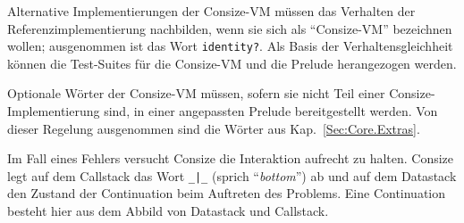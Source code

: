 Alternative Implementierungen der Consize-VM müssen das Verhalten der Referenzimplementierung nachbilden, wenn sie sich als "`Consize-VM"' bezeichnen wollen; ausgenommen ist das Wort \verb|identity?|. Als Basis der Verhaltensgleichheit können die Test-Suites für die Consize-VM und die Prelude herangezogen werden.

Optionale Wörter der Consize-VM müssen, sofern sie nicht Teil einer Consize-Implementierung sind, in einer angepassten Prelude bereitgestellt werden. Von dieser Regelung ausgenommen sind die Wörter aus Kap.~\ref{Sec:Core.Extras}.

Im Fall eines Fehlers versucht Consize die Interaktion aufrecht zu halten. Consize legt auf dem Callstack das Wort \verb/_|_/ (sprich "`\emph{bottom}"') ab und auf dem Datastack den Zustand der Continuation beim Auftreten des Problems. Eine Continuation besteht hier aus dem Abbild von Datastack und Callstack.
